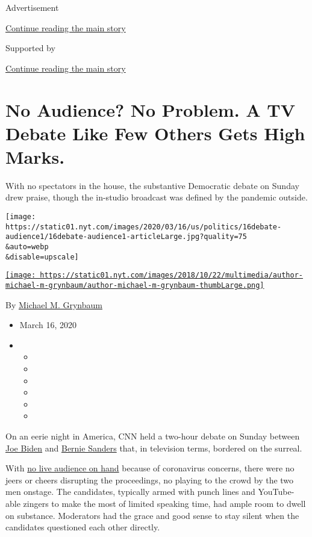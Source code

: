 Advertisement

\protect\hyperlink{after-top}{Continue reading the main story}

Supported by

\protect\hyperlink{after-sponsor}{Continue reading the main story}

\hypertarget{no-audience-no-problem-a-tv-debate-like-few-others-gets-high-marks}{%
\section{No Audience? No Problem. A TV Debate Like Few Others Gets High
Marks.}\label{no-audience-no-problem-a-tv-debate-like-few-others-gets-high-marks}}

With no spectators in the house, the substantive Democratic debate on
Sunday drew praise, though the in-studio broadcast was defined by the
pandemic outside.

\texttt{[image: https://static01.nyt.com/images/2020/03/16/us/politics/16debate-audience1/16debate-audience1-articleLarge.jpg?quality=75\\\&auto=webp\\\&disable=upscale]}

\href{https://www.nytimes.com/by/michael-m-grynbaum}{\texttt{[image: https://static01.nyt.com/images/2018/10/22/multimedia/author-michael-m-grynbaum/author-michael-m-grynbaum-thumbLarge.png]}}

By \href{https://www.nytimes.com/by/michael-m-grynbaum}{Michael M.
Grynbaum}

\begin{itemize}
\item
  March 16, 2020
\item
  \begin{itemize}
  \item
  \item
  \item
  \item
  \item
  \item
  \end{itemize}
\end{itemize}

On an eerie night in America, CNN held a two-hour debate on Sunday
between
\href{https://www.nytimes.com/interactive/2020/us/elections/joe-biden.html}{Joe
Biden} and
\href{https://www.nytimes.com/interactive/2020/us/elections/bernie-sanders.html}{Bernie
Sanders} that, in television terms, bordered on the surreal.

With
\href{https://www.nytimes.com/2020/03/15/us/politics/cnn-democratic-debate-coronavirus.html}{no
live audience on hand} because of coronavirus concerns, there were no
jeers or cheers disrupting the proceedings, no playing to the crowd by
the two men onstage. The candidates, typically armed with punch lines
and YouTube-able zingers to make the most of limited speaking time, had
ample room to dwell on substance. Moderators had the grace and good
sense to stay silent when the candidates questioned each other directly.

